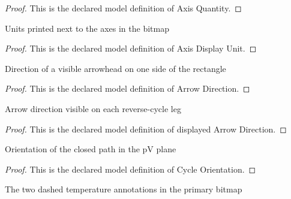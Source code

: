 \begin{proof}
  This is the declared model definition of Axis Quantity.
\end{proof}
\begin{definition}
  \label{def:physics:phyx-mini-0435:phyxminiproblems-problemphyxmini0435-axisdisplayunit}
  Units printed next to the axes in the bitmap
\end{definition}
\begin{proof}
  This is the declared model definition of Axis Display Unit.
\end{proof}
\begin{definition}
  \label{def:physics:phyx-mini-0435:phyxminiproblems-problemphyxmini0435-arrowdirection}
  Direction of a visible arrowhead on one side of the rectangle
\end{definition}
\begin{proof}
  This is the declared model definition of Arrow Direction.
\end{proof}
\begin{definition}
  \label{def:physics:phyx-mini-0435:phyxminiproblems-problemphyxmini0435-displayedarrowdirection}
  Arrow direction visible on each reverse-cycle leg
\end{definition}
\begin{proof}
  This is the declared model definition of displayed Arrow Direction.
\end{proof}
\begin{definition}
  \label{def:physics:phyx-mini-0435:phyxminiproblems-problemphyxmini0435-cycleorientation}
  Orientation of the closed path in the pV plane
\end{definition}
\begin{proof}
  This is the declared model definition of Cycle Orientation.
\end{proof}
\begin{definition}
  \label{def:physics:phyx-mini-0435:phyxminiproblems-problemphyxmini0435-isothermlabel}
  The two dashed temperature annotations in the primary bitmap
\end{definition}
